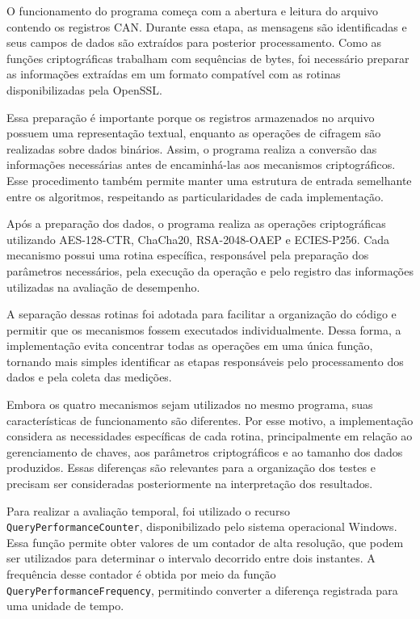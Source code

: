 O funcionamento do programa começa com a abertura e leitura do arquivo contendo os registros CAN. Durante essa etapa, as mensagens são identificadas e seus campos de dados são extraídos para posterior processamento. Como as funções criptográficas trabalham com sequências de bytes, foi necessário preparar as informações extraídas em um formato compatível com as rotinas disponibilizadas pela OpenSSL.

Essa preparação é importante porque os registros armazenados no arquivo possuem uma representação textual, enquanto as operações de cifragem são realizadas sobre dados binários. Assim, o programa realiza a conversão das informações necessárias antes de encaminhá-las aos mecanismos criptográficos. Esse procedimento também permite manter uma estrutura de entrada semelhante entre os algoritmos, respeitando as particularidades de cada implementação.

Após a preparação dos dados, o programa realiza as operações criptográficas utilizando AES-128-CTR, ChaCha20, RSA-2048-OAEP e ECIES-P256. Cada mecanismo possui uma rotina específica, responsável pela preparação dos parâmetros necessários, pela execução da operação e pelo registro das informações utilizadas na avaliação de desempenho.

A separação dessas rotinas foi adotada para facilitar a organização do código e permitir que os mecanismos fossem executados individualmente. Dessa forma, a implementação evita concentrar todas as operações em uma única função, tornando mais simples identificar as etapas responsáveis pelo processamento dos dados e pela coleta das medições.

Embora os quatro mecanismos sejam utilizados no mesmo programa, suas características de funcionamento são diferentes. Por esse motivo, a implementação considera as necessidades específicas de cada rotina, principalmente em relação ao gerenciamento de chaves, aos parâmetros criptográficos e ao tamanho dos dados produzidos. Essas diferenças são relevantes para a organização dos testes e precisam ser consideradas posteriormente na interpretação dos resultados.

Para realizar a avaliação temporal, foi utilizado o recurso \texttt{QueryPerformanceCounter}, disponibilizado pelo sistema operacional Windows. Essa função permite obter valores de um contador de alta resolução, que podem ser utilizados para determinar o intervalo decorrido entre dois instantes. A frequência desse contador é obtida por meio da função \texttt{QueryPerformanceFrequency}, permitindo converter a diferença registrada para uma unidade de tempo.

